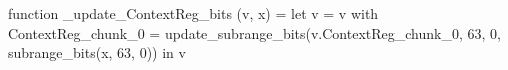 function _update_ContextReg_bits (v, x) = let v = { v with ContextReg_chunk_0 = update_subrange_bits(v.ContextReg_chunk_0, 63, 0, subrange_bits(x, 63, 0)) } in
  v
